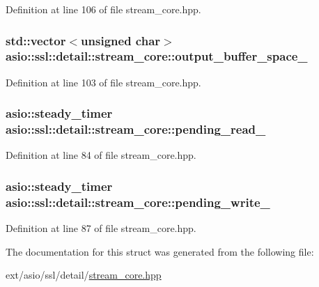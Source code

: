 Definition at line 106 of file stream\+\_\+core.\+hpp.

\hypertarget{structasio_1_1ssl_1_1detail_1_1stream__core_a83e532493488c0634ce810b55ff69dc5}{}
\subsubsection[{output\+\_\+buffer\+\_\+space\+\_\+}]{\setlength{\rightskip}{0pt plus 5cm}std\+::vector$<$unsigned char$>$ asio\+::ssl\+::detail\+::stream\+\_\+core\+::output\+\_\+buffer\+\_\+space\+\_\+}\label{structasio_1_1ssl_1_1detail_1_1stream__core_a83e532493488c0634ce810b55ff69dc5}


Definition at line 103 of file stream\+\_\+core.\+hpp.

\hypertarget{structasio_1_1ssl_1_1detail_1_1stream__core_a08b94b7de2721f0626661c5961763839}{}
\subsubsection[{pending\+\_\+read\+\_\+}]{\setlength{\rightskip}{0pt plus 5cm}asio\+::steady\+\_\+timer asio\+::ssl\+::detail\+::stream\+\_\+core\+::pending\+\_\+read\+\_\+}\label{structasio_1_1ssl_1_1detail_1_1stream__core_a08b94b7de2721f0626661c5961763839}


Definition at line 84 of file stream\+\_\+core.\+hpp.

\hypertarget{structasio_1_1ssl_1_1detail_1_1stream__core_a98ba1a9b9f73132718a94a124f76ad63}{}
\subsubsection[{pending\+\_\+write\+\_\+}]{\setlength{\rightskip}{0pt plus 5cm}asio\+::steady\+\_\+timer asio\+::ssl\+::detail\+::stream\+\_\+core\+::pending\+\_\+write\+\_\+}\label{structasio_1_1ssl_1_1detail_1_1stream__core_a98ba1a9b9f73132718a94a124f76ad63}


Definition at line 87 of file stream\+\_\+core.\+hpp.



The documentation for this struct was generated from the following file\+:\begin{DoxyCompactItemize}
\item 
ext/asio/ssl/detail/\hyperlink{stream__core_8hpp}{stream\+\_\+core.\+hpp}\end{DoxyCompactItemize}
